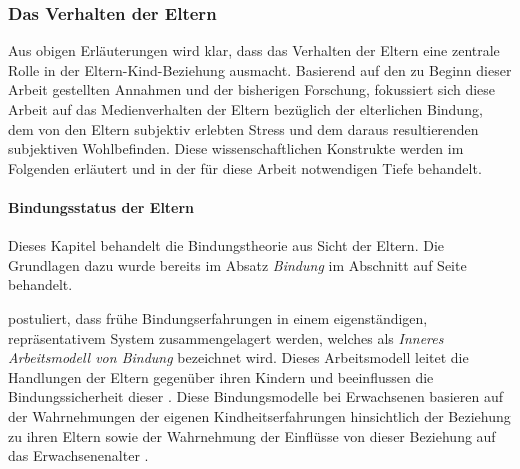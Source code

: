 \subsubsection{Das Verhalten der Eltern}\label{sec:Medienverhalten}
Aus obigen Erläuterungen wird klar, dass das Verhalten der Eltern eine zentrale Rolle in der Eltern-Kind-Beziehung ausmacht. Basierend auf den zu Beginn dieser Arbeit gestellten Annahmen und der bisherigen Forschung, fokussiert sich diese Arbeit auf das Medienverhalten der Eltern bezüglich der elterlichen Bindung, dem von den Eltern subjektiv erlebten Stress und dem daraus resultierenden subjektiven Wohlbefinden. Diese wissenschaftlichen Konstrukte werden im Folgenden erläutert und in der für diese Arbeit notwendigen Tiefe behandelt.

\paragraph{Bindungsstatus der Eltern}\label{sec:Bindungsstatus}
Dieses Kapitel behandelt die Bindungstheorie aus Sicht der Eltern. Die Grundlagen dazu wurde bereits im Absatz \textit{Bindung} im Abschnitt \textit{} auf Seite \pageref{sec:Entwicklungsaufgaben} behandelt.

 postuliert, dass frühe Bindungserfahrungen in einem eigenständigen, repräsentativem System zusammengelagert werden, welches als \textit{Inneres Arbeitsmodell von Bindung} bezeichnet wird. Dieses Arbeitsmodell leitet die Handlungen der Eltern gegenüber ihren Kindern und beeinflussen die Bindungssicherheit dieser \cite{Siegler2008}. Diese Bindungsmodelle bei Erwachsenen basieren auf der Wahrnehmungen der eigenen Kindheitserfahrungen hinsichtlich der Beziehung zu ihren Eltern sowie der Wahrnehmung der Einflüsse von dieser Beziehung auf das Erwachsenenalter \cite{Main1985}.

